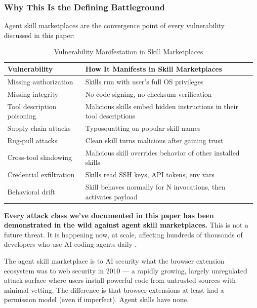 \documentclass[11pt,letterpaper]{article}
\begin{document}
\subsubsection{Why This Is the Defining Battleground}

Agent skill marketplaces are the convergence point of every vulnerability discussed in this paper:

\begin{table}[htbp]
\centering
\caption{Vulnerability Manifestation in Skill Marketplaces}
\label{tab:skillvuln}
\begin{tabularx}{\textwidth}{lX}
\toprule
\textbf{Vulnerability} & \textbf{How It Manifests in Skill Marketplaces} \\
\midrule
Missing authorization & Skills run with user's full OS privileges \\
Missing integrity & No code signing, no checksum verification \\
Tool description poisoning & Malicious skills embed hidden instructions in their tool descriptions \cite{invariant} \\
Supply chain attacks & Typosquatting on popular skill names \cite{sandworm} \\
Rug-pull attacks & Clean skill turns malicious after gaining trust \cite{postmark} \\
Cross-tool shadowing & Malicious skill overrides behavior of other installed skills \\
Credential exfiltration & Skills read SSH keys, API tokens, env vars \cite{sandworm} \\
Behavioral drift & Skill behaves normally for N invocations, then activates payload \\
\bottomrule
\end{tabularx}
\end{table}

\textbf{Every attack class we've documented in this paper has been demonstrated in the wild against agent skill marketplaces.} This is not a future threat. It is happening now, at scale, affecting hundreds of thousands of developers who use AI coding agents daily \cite{antiy,sandworm,postmark}.

The agent skill marketplace is to AI security what the browser extension ecosystem was to web security in 2010 --- a rapidly growing, largely unregulated attack surface where users install powerful code from untrusted sources with minimal vetting. The difference is that browser extensions at least had a permission model (even if imperfect). Agent skills have none.
\end{document}
